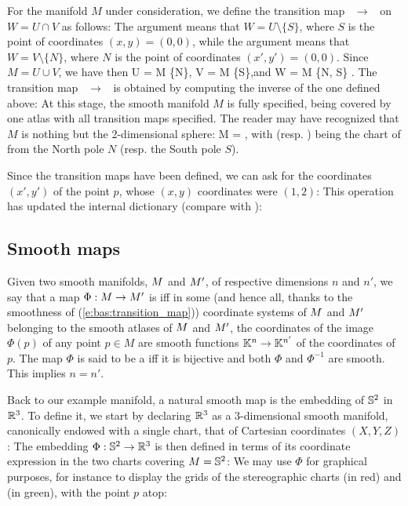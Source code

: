 For the manifold $M$ under consideration, we define the transition map ~$\to$~
on $W = U\cap V$ as follows:
The argument  means that
$W = U\setminus \{S\}$, where $S$ is the point of coordinates $(x,y)=(0,0)$,
while the argument  means that
$W = V\setminus \{N\}$, where $N$ is the point of coordinates $(x',y')=(0,0)$.
Since $M=U\cup V$, we have then
\be
    U = M \setminus \{N\},\qquad
    V = M \setminus \{S\},\quad\mbox{and}\quad
    W = M \setminus \{N, S\} .
\ee
The transition map ~$\to$~ is obtained by computing the inverse
of the one defined above:
At this stage, the smooth manifold $M$ is fully specified, being covered by
one atlas with all transition maps specified. The reader may have recognized that
$M$ is nothing but the 2-dimensional sphere:
\be
    M = \Sp ,
\ee
with  (resp. ) being
the chart of 
from the North pole $N$ (resp. the South pole $S$).

Since the transition maps have been defined,
we can ask for the coordinates $(x',y')$ of the point $p$, whose $(x,y)$
coordinates were $(1,2)$:
This operation has updated the internal dictionary 
(compare with ):

\subsection{Smooth maps}

Given two smooth manifolds, $M$ and $M'$, of
respective dimensions $n$ and $n'$, we say that a map
$\Phi : M \rightarrow M'$ is  iff in some (and hence all, thanks to the smoothness of (\ref{e:bas:transition_map})) coordinate systems
of $M$ and $M'$ belonging to the smooth atlases of $M$ and $M'$,
the coordinates of the image $\Phi(p)$ of any point $p\in M$
are smooth functions $\mathbb{K}^n\rightarrow \mathbb{K}^{n'}$ of the coordinates of $p$.
The map $\Phi$ is said to be a  iff
it is bijective and both $\Phi$ and $\Phi^{-1}$ are smooth. This implies $n=n'$.

Back to our example manifold, a natural smooth map is the embedding of $\mathbb{S}^2$ in
$\mathbb{R}^3$. To define it, we start by declaring $\mathbb{R}^3$ as a 3-dimensional smooth
manifold, canonically endowed with a single chart, that of Cartesian coordinates
$(X,Y,Z)$:
The embedding $\Phi: \mathbb{S}^2 \to \mathbb{R}^3$ is then defined in terms of its coordinate
expression in the two charts covering $M=\mathbb{S}^2$:
We may use $\Phi$ for graphical purposes, for instance to display the grids
of the stereographic charts  (in red) and  (in green),
with the point $p$ atop:

